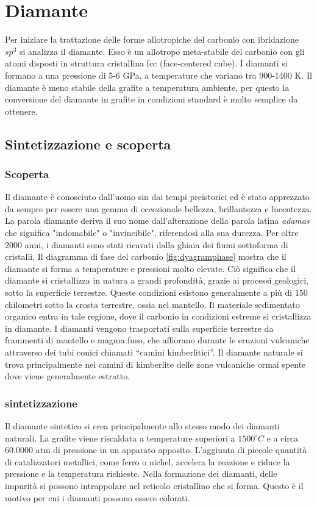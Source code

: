 \documentclass[a4paper,titlepage]{book}
\begin{document}
\chapter {Diamante}
Per iniziare la trattazione delle forme allotropiche del carbonio con ibridazione $sp^3$ si analizza il diamante.
Esso è un allotropo meta-stabile del carbonio con gli atomi disposti in struttura cristallina fcc (face-centered cube). I diamanti si formano a una pressione di 5-6 GPa, a temperature che variano tra 900-1400 K. Il diamante è meno stabile della grafite a temperatura ambiente, per questo la conversione del diamante in grafite in condizioni standard è molto semplice da ottenere. 
\section{Sintetizzazione e scoperta}
\subsection{Scoperta}
Il diamante è conosciuto dall'uomo sin dai tempi preistorici ed è stato apprezzato da sempre per essere una gemma di eccezionale bellezza, brillantezza e lucentezza. La parola diamante deriva il suo nome dall'alterazione della parola latina \textit{adamas} che significa "indomabile" o "invincibile", riferendosi alla sua durezza. Per oltre 2000 anni, i diamanti sono stati ricavati dalla ghiaia dei fiumi sottoforma di cristalli.
Il diagramma di fase del carbonio \ref{fig:dyagramphase} mostra che il diamante si forma a temperature e pressioni molto elevate. Ciò significa che il diamante si cristallizza in natura a grandi profondità, grazie ai processi geologici, sotto la superficie terrestre. Queste condizioni esistono generalmente a più di 150 chilometri sotto la crosta terrestre, ossia nel mantello. Il materiale sedimentato organico entra in tale regione, dove il carbonio in condizioni estreme si cristallizza in diamante. I diamanti vengono trasportati sulla superficie terrestre da frammenti di mantello e magma fuso, che affiorano durante le eruzioni vulcaniche attraverso dei tubi conici chiamati “camini kimberlitici”. Il diamante naturale si trova principalmente nei camini di kimberlite delle zone vulcaniche ormai spente dove viene generalmente estratto.
\subsection{sintetizzazione}
Il diamante sintetico si crea principalmente allo stesso modo dei diamanti naturali. La grafite viene riscaldata a temperature superiori a $1500^\circ C$ e a circa 60.0000 atm di pressione in un apparato apposito. L'aggiunta di piccole quantità di catalizzatori metallici, come ferro o nichel, accelera la reazione e riduce la pressione e la temperatura richieste. Nella formazione dei diamanti, delle impurità si possono intrappolare nel reticolo cristallino che si forma. Questo è il motivo per cui i diamanti possono essere colorati.
\end{document}
